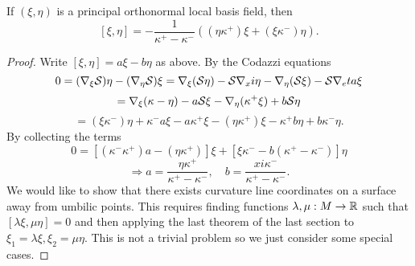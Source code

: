\begin{lemma}
	
	If $ (\xi,\eta) $ is a principal orthonormal local basis field, then
		\[ [\xi,\eta] = - \dfrac{1}{\kappa^+ - \kappa^-}((\eta\kappa^+)\xi + (\xi\kappa^-)\eta). \]
	
\end{lemma}

\begin{proof}
	
	Write $ [\xi,\eta] = a\xi - b\eta $ as above. By the Codazzi equations
		\[ 0 = (\nabla_\xi \mathcal S)\eta - (\nabla_\eta \mathcal S) \xi = \nabla_\xi(\mathcal S\eta) - \mathcal S\nabla_xi \eta - \nabla_\eta(\mathcal S\xi) - \mathcal S\nabla_eta \xi  \]
		\[ = \nabla_\xi(\kappa- \eta) - a \mathcal S \xi - \nabla_\eta(\kappa^+\xi) + b\mathcal S\eta \]
		\[ = (\xi\kappa^-) \eta + \kappa^-a\xi -a\kappa^+\xi - (\eta\kappa^+)\xi - \kappa^+b\eta + b \kappa^-\eta. \]
	By collecting the terms
		\[ 0 = [ (\kappa^- \kappa^+)a - (\eta\kappa^+) ]\xi + [ \xi \kappa^- - b(\kappa^+ - \kappa^-) ] \eta \]
		\[ \Rightarrow a = \dfrac{\eta \kappa^+}{\kappa^+ - \kappa^-}, \quad b= \dfrac{xi \kappa^-}{\kappa^+ - \kappa^-}. \]
	We would like to show that there exists curvature line coordinates on a surface away from umbilic points. This requires finding functions $ \lambda,\mu: M \rightarrow \mathbb R $ such that $ [ \lambda\xi,\mu\eta ] = 0 $ and  then applying the last theorem of the last section to $ \xi_1 = \lambda\xi, \xi_2 = \mu \eta $. This is not a trivial problem so we just consider some special cases.
	
			
\end{proof}